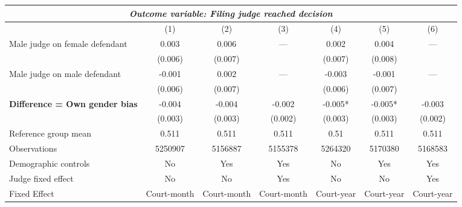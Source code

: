 {
\def\sym#1{\ifmmode^{#1}\else\(^{#1}\)\fi}
\begin{tabular}{l*{6}{c}}
  \hline\hline
\multicolumn{7}{c}{\textit{Outcome variable: Filing judge reached decision}}\\
\hline
&\multicolumn{1}{c}{(1)}&\multicolumn{1}{c}{(2)}&\multicolumn{1}{c}{(3)}&\multicolumn{1}{c}{(4)}&\multicolumn{1}{c}{(5)}&\multicolumn{1}{c}{(6)}\\
\hline
Male judge on female defendant \hspace{15mm} & 0.003 & 0.006 & --- & 0.002 & 0.004 & --- \\
& (0.006) & (0.007) &  & (0.007) &(0.008) &  \\
Male judge on male defendant \hspace{15mm} & -0.001 & 0.002 & ---& -0.003 & -0.001 & --- \\
& (0.006) & (0.007) &  & (0.006) & (0.007) &  \\
\textbf{Difference = Own gender bias} \hspace{15mm} & -0.004 & -0.004 & -0.002 & -0.005* & -0.005* & -0.003 \\
& (0.003) & (0.003) & (0.002) & (0.003) & (0.003) & (0.002) \\
\hline
Reference group mean & 0.511 & 0.511 & 0.511 & 0.51 & 0.511 & 0.511 \\
Observations & 5250907 & 5156887 & 5155378 & 5264320 & 5170380 & 5168583 \\
Demographic controls & No & Yes & Yes & No & Yes & Yes \\
Judge fixed effect & No & No & Yes & No & No & Yes \\
Fixed Effect & Court-month & Court-month & Court-month & Court-year & Court-year & Court-year \\
\hline\hline
\end{tabular}
}
 
